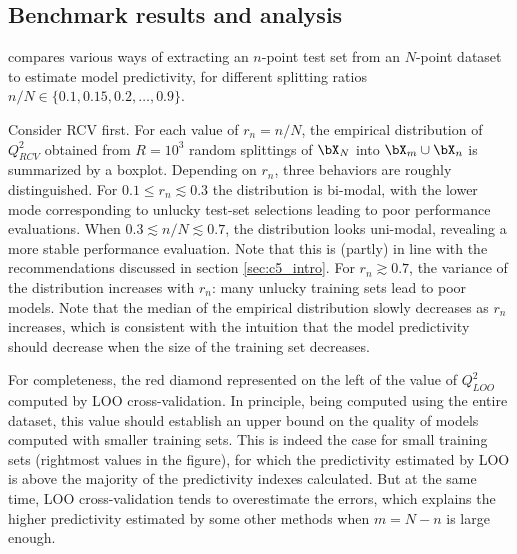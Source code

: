 \subsection{Benchmark results and analysis}

 compares various ways of extracting an $n$-point test set from an $N$-point dataset to estimate model predictivity, for different splitting ratios $n/N\in\{0.1,0.15,0.2,\ldots,0.9\}$. 

Consider RCV first. For each value of $r_n=n/N$, the empirical distribution of $Q^2_{RCV}$ obtained from $R=10^3$ random splittings of $\bX_N$ into $\bX_m\cup\bX_n$ is summarized by a boxplot. 
Depending on $r_n$, three behaviors are roughly distinguished. 
For $0.1 \leq r_n \lesssim 0.3$ the distribution is bi-modal, with the lower mode corresponding to unlucky test-set selections leading to poor performance evaluations. 
When $0.3 \lesssim n/N \lesssim 0.7$, the distribution looks uni-modal, revealing a more stable performance evaluation. 
Note that this is (partly) in line with the recommendations discussed in section \ref{sec:c5_intro}. 
For $r_n \gtrsim 0.7$, the variance of the distribution increases with $r_n$: many unlucky training sets lead to poor models. 
Note that the median of the empirical distribution slowly decreases as $r_n$ increases, which is consistent with the intuition that the model predictivity should decrease when the size of the training set decreases. 

For completeness, the red diamond represented on the left of  the value of $Q^2_{LOO}$ computed by LOO cross-validation. 
In principle, being computed using the entire dataset, this value should establish an upper bound on the quality of models computed with smaller training sets. 
This is indeed the case for small training sets (rightmost values in the figure), for which the predictivity estimated by LOO is above the majority of the predictivity indexes calculated. 
But at the same time, LOO cross-validation tends to overestimate the errors, which explains the higher predictivity estimated by some other methods when $m=N-n$ is large enough.

